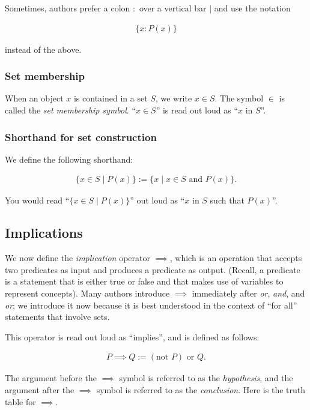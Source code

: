 Sometimes, authors prefer a colon $:$ over a vertical bar $|$ and use the notation 

\begin{align*}
    \{ x : P(x) \}
\end{align*}

instead of the above.

\subsubsection*{Set membership}

When an object $x$ is contained in a set $S$, we write $x \in S$. The symbol $\in$ is called the \textit{set membership symbol}. ``$x \in S$'' is read out loud as ``$x$ in $S$''.

\subsubsection*{Shorthand for set construction}

We define the following shorthand:

\begin{align*}
    \{ x \in S \mid P(x)\} := \{ x \mid x \in S \text{ and } P(x)\}.
\end{align*}

You would read ``$\{ x \in S \mid P(x)\}$'' out loud as ``$x$ in $S$ such that $P(x)$''.

\newpage

\subsection*{Implications}

We now define the \textit{implication} operator $\implies$, which is an operation that accepts two predicates as input and produces a predicate as output. (Recall, a predicate is a statement that is either true or false and that makes use of variables to represent concepts). Many authors introduce $\implies$ immediately after \textit{or}, \textit{and}, and \textit{or}; we introduce it now because it is best understood in the context of ``for all'' statements that involve sets.

This operator is read out loud as ``implies'', and is defined as follows:

\begin{align*}
    P \implies Q := (\text{not } P) \text{ or } Q.
\end{align*}

The argument before the $\implies$ symbol is referred to as the \textit{hypothesis}, and the argument after the $\implies$ symbol is referred to as the \textit{conclusion}. Here is the truth table for $\implies$.

